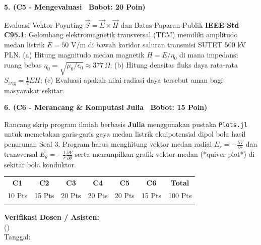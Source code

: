 \documentclass[10pt,a4paper]{article}
\begin{document}
\noindent\textbf{5. (C5 - Mengevaluasi \textbar\ Bobot: 20 Poin)}\par\vspace{0.8mm}
{\footnotesize Evaluasi Vektor Poynting $\vec{S} = \vec{E} \times \vec{H}$ dan Batas Paparan Publik \textbf{IEEE Std C95.1}: Gelombang elektromagnetik transversal (TEM) memiliki amplitudo medan listrik $E = 50\text{ V/m}$ di bawah koridor saluran transmisi SUTET 500 kV PLN. (a) Hitung magnitudo medan magnetik $H = E/\eta_0$ di mana impedansi ruang bebas $\eta_0 = \sqrt{\mu_0/\epsilon_0} \approx 377\,\Omega$; (b) Hitung densitas fluks daya rata-rata $S_{\text{avg}} = \frac{1}{2} E H$; (c) Evaluasi apakah nilai radiasi daya tersebut aman bagi masyarakat sekitar.}\par

\vspace{3.5mm}

\noindent\textbf{6. (C6 - Merancang \& Komputasi Julia \textbar\ Bobot: 15 Poin)}\par\vspace{0.8mm}
{\footnotesize Rancang skrip program ilmiah berbasis \textbf{Julia} menggunakan pustaka \texttt{Plots.jl} untuk memetakan garis-garis gaya medan listrik ekuipotensial dipol bola hasil penurunan Soal 3. Program harus menghitung vektor medan radial $E_r = -\frac{\partial V}{\partial r}$ dan transversal $E_\theta = -\frac{1}{r}\frac{\partial V}{\partial \theta}$ serta menampilkan grafik vektor medan (*quiver plot*) di sekitar bola konduktor.}\par

\vfill

\noindent\begin{minipage}[b]{0.62\textwidth}%
  \centering
  \scriptsize
  \begin{tabular}{|c|c|c|c|c|c|c|}
    \hline
    \rowcolor{unibblue}
    \textbf{\color{white}C1} & \textbf{\color{white}C2} & \textbf{\color{white}C3} & \textbf{\color{white}C4} & \textbf{\color{white}C5} & \textbf{\color{white}C6} & \textbf{\color{white}Total} \\
    \rowcolor{unibblue!10}
    10 Pts & 15 Pts & 20 Pts & 20 Pts & 20 Pts & 15 Pts & 100 Pts \\
    \hline
    & & & & & & \\[3mm]
    \hline
  \end{tabular}%
\end{minipage}%
\hfill%
\begin{minipage}[b]{0.35\textwidth}%
  \centering
  \scriptsize
  \textbf{Verifikasi Dosen / Asisten:}\\[6mm]
  (\dotfill)\\[1mm]
  \tiny Tanggal: \dotfill
\end{minipage}\par
\end{document}
